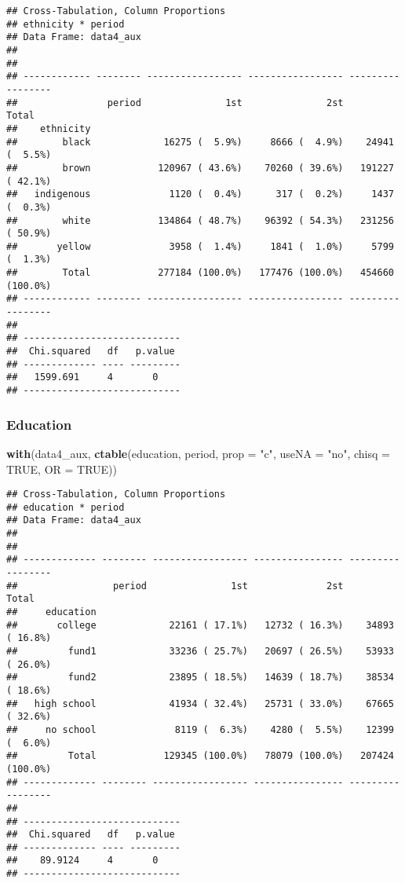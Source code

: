 \documentclass[
]{article}
\newenvironment{Shaded}{\begin{snugshade}}{\end{snugshade}}
\newcommand{\DataTypeTok}[1]{\textcolor[rgb]{0.13,0.29,0.53}{#1}}
\newcommand{\KeywordTok}[1]{\textcolor[rgb]{0.13,0.29,0.53}{\textbf{#1}}}
\newcommand{\NormalTok}[1]{#1}
\newcommand{\OtherTok}[1]{\textcolor[rgb]{0.56,0.35,0.01}{#1}}
\newcommand{\StringTok}[1]{\textcolor[rgb]{0.31,0.60,0.02}{#1}}
\begin{document}
\begin{verbatim}
## Cross-Tabulation, Column Proportions  
## ethnicity * period  
## Data Frame: data4_aux  
## 
## 
## ------------ -------- ----------------- ----------------- -----------------
##                period               1st               2st             Total
##    ethnicity                                                               
##        black             16275 (  5.9%)     8666 (  4.9%)    24941 (  5.5%)
##        brown            120967 ( 43.6%)    70260 ( 39.6%)   191227 ( 42.1%)
##   indigenous              1120 (  0.4%)      317 (  0.2%)     1437 (  0.3%)
##        white            134864 ( 48.7%)    96392 ( 54.3%)   231256 ( 50.9%)
##       yellow              3958 (  1.4%)     1841 (  1.0%)     5799 (  1.3%)
##        Total            277184 (100.0%)   177476 (100.0%)   454660 (100.0%)
## ------------ -------- ----------------- ----------------- -----------------
## 
## ----------------------------
##  Chi.squared   df   p.value 
## ------------- ---- ---------
##   1599.691     4       0    
## ----------------------------
\end{verbatim}

\hypertarget{education-1}{%
\subsubsection{Education}\label{education-1}}

\begin{Shaded}
\begin{Highlighting}[]
\KeywordTok{with}\NormalTok{(data4_aux, }\KeywordTok{ctable}\NormalTok{(education, period, }\DataTypeTok{prop =} \StringTok{"c"}\NormalTok{, }\DataTypeTok{useNA =} \StringTok{"no"}\NormalTok{, }\DataTypeTok{chisq =} \OtherTok{TRUE}\NormalTok{, }\DataTypeTok{OR =} \OtherTok{TRUE}\NormalTok{))}
\end{Highlighting}
\end{Shaded}

\begin{verbatim}
## Cross-Tabulation, Column Proportions  
## education * period  
## Data Frame: data4_aux  
## 
## 
## ------------- -------- ----------------- ---------------- -----------------
##                 period               1st              2st             Total
##     education                                                              
##       college             22161 ( 17.1%)   12732 ( 16.3%)    34893 ( 16.8%)
##         fund1             33236 ( 25.7%)   20697 ( 26.5%)    53933 ( 26.0%)
##         fund2             23895 ( 18.5%)   14639 ( 18.7%)    38534 ( 18.6%)
##   high school             41934 ( 32.4%)   25731 ( 33.0%)    67665 ( 32.6%)
##     no school              8119 (  6.3%)    4280 (  5.5%)    12399 (  6.0%)
##         Total            129345 (100.0%)   78079 (100.0%)   207424 (100.0%)
## ------------- -------- ----------------- ---------------- -----------------
## 
## ----------------------------
##  Chi.squared   df   p.value 
## ------------- ---- ---------
##    89.9124     4       0    
## ----------------------------
\end{verbatim}
\end{document}
